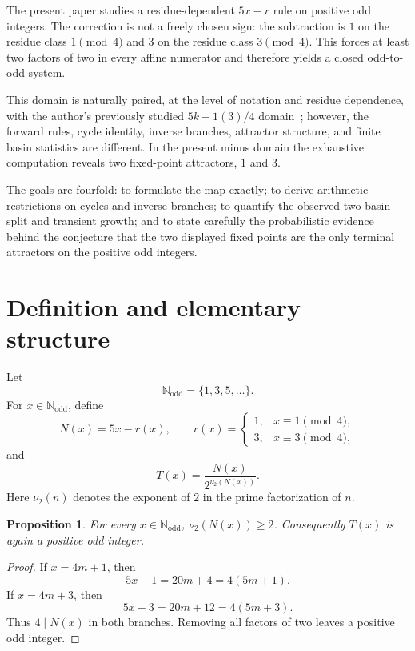 \documentclass[11pt]{article}
\newtheorem{proposition}{Proposition}
\newcommand{\vTwo}{\nu_2}
\begin{document}
The present paper studies a residue-dependent $5x-r$ rule on positive odd integers. The correction is not a freely chosen sign: the subtraction is $1$ on the residue class $1\pmod4$ and $3$ on the residue class $3\pmod4$. This forces at least two factors of two in every affine numerator and therefore yields a closed odd-to-odd system.

This domain is naturally paired, at the level of notation and residue dependence, with the author's previously studied $5k+1(3)/4$ domain~\cite{Banazadeh2026Plus}; however, the forward rules, cycle identity, inverse branches, attractor structure, and finite basin statistics are different. In the present minus domain the exhaustive computation reveals two fixed-point attractors, $1$ and $3$.

The goals are fourfold: to formulate the map exactly; to derive arithmetic restrictions on cycles and inverse branches; to quantify the observed two-basin split and transient growth; and to state carefully the probabilistic evidence behind the conjecture that the two displayed fixed points are the only terminal attractors on the positive odd integers.

\section{Definition and elementary structure}

Let
\[
\mathbb N_{\mathrm{odd}}=\{1,3,5,\ldots\}.
\]
For $x\in\mathbb N_{\mathrm{odd}}$, define
\begin{equation}
N(x)=5x-r(x),\qquad
r(x)=\begin{cases}
1,&x\equiv1\pmod4,\\
3,&x\equiv3\pmod4,
\end{cases}
\end{equation}
and
\begin{equation}
T(x)=\frac{N(x)}{2^{\vTwo(N(x))}}.
\end{equation}
Here $\vTwo(n)$ denotes the exponent of $2$ in the prime factorization of $n$.

\begin{proposition}
For every $x\in\mathbb N_{\mathrm{odd}}$, $\vTwo(N(x))\ge2$. Consequently $T(x)$ is again a positive odd integer.
\end{proposition}

\begin{proof}
If $x=4m+1$, then
\[
5x-1=20m+4=4(5m+1).
\]
If $x=4m+3$, then
\[
5x-3=20m+12=4(5m+3).
\]
Thus $4\mid N(x)$ in both branches. Removing all factors of two leaves a positive odd integer.
\end{proof}
\end{document}
